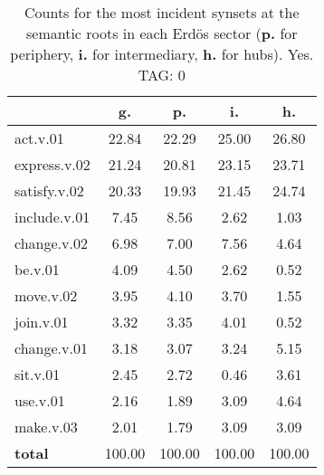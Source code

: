 \begin{table}[h!]
\begin{center}
\begin{tabular}{| l || c | c | c | c |}\hline
 & {\bf g.} & {\bf p.} & {\bf i.} & {\bf h.} \\\hline\hline
act.v.01 & 22.84  & 22.29  & 25.00  & 26.80 \\\hline
express.v.02 & 21.24  & 20.81  & 23.15  & 23.71 \\\hline
satisfy.v.02 & 20.33  & 19.93  & 21.45  & 24.74 \\\hline
include.v.01 & 7.45  & 8.56  & 2.62  & 1.03 \\\hline
change.v.02 & 6.98  & 7.00  & 7.56  & 4.64 \\\hline
be.v.01 & 4.09  & 4.50  & 2.62  & 0.52 \\\hline
move.v.02 & 3.95  & 4.10  & 3.70  & 1.55 \\\hline
join.v.01 & 3.32  & 3.35  & 4.01  & 0.52 \\\hline
change.v.01 & 3.18  & 3.07  & 3.24  & 5.15 \\\hline
sit.v.01 & 2.45  & 2.72  & 0.46  & 3.61 \\\hline
use.v.01 & 2.16  & 1.89  & 3.09  & 4.64 \\\hline
make.v.03 & 2.01  & 1.79  & 3.09  & 3.09 \\\hline\hline
{{\bf total}} & 100.00  & 100.00  & 100.00  & 100.00 \\\hline
\end{tabular}
\caption{Counts for the most incident synsets at the semantic roots in each Erd\"os sector ({\bf p.} for periphery, {\bf i.} for intermediary, {\bf h.} for hubs). Yes. TAG: 0}
\end{center}
\end{table}